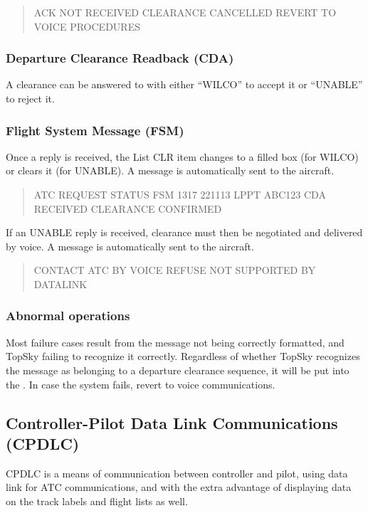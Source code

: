 \documentclass[a4paper,oneside,11pt]{memoir}
\begin{document}
\begin{quote}
  ACK NOT RECEIVED CLEARANCE CANCELLED REVERT TO VOICE PROCEDURES
\end{quote}

\subsubsection{Departure Clearance Readback (CDA)}

A clearance can be answered to with either “WILCO” to accept it or “UNABLE” to reject it.

\subsubsection{Flight System Message (FSM)}

Once a reply is received, the List CLR item changes to a filled box (for WILCO) or clears it (for UNABLE). A message is automatically sent to the aircraft.

\begin{quote}
  ATC REQUEST STATUS FSM 1317 221113 LPPT ABC123 CDA RECEIVED CLEARANCE CONFIRMED 
\end{quote}

If an UNABLE reply is received, clearance must then be negotiated and delivered by voice. A message is automatically sent to the aircraft.

\begin{quote}
  CONTACT ATC BY VOICE REFUSE NOT SUPPORTED BY DATALINK
\end{quote}

\subsubsection{Abnormal operations}

Most failure cases result from the message not being correctly formatted, and TopSky failing to recognize it correctly. Regardless of whether TopSky recognizes the message as belonging to a departure clearance sequence, it will be put into the . In case the system fails, revert to voice communications.

\subsection{Controller-Pilot Data Link Communications (CPDLC)}
\label{cpdlc}

CPDLC is a means of communication between controller and pilot, using data link for ATC communications, and with the extra advantage of displaying data on the track labels and flight lists as well.
\end{document}
